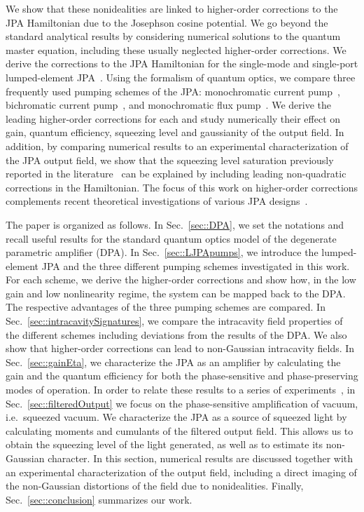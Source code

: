 \documentclass[pra,twocolumn,superscriptaddress]{revtex4-1}
\begin{document}
We show that these nonidealities are linked to higher-order corrections to the JPA Hamiltonian due to the Josephson cosine potential. We go beyond the standard analytical results by considering numerical solutions to the quantum master equation, including these usually neglected higher-order corrections. We derive the corrections to the JPA Hamiltonian for the single-mode and single-port lumped-element JPA~\cite{Roy:2016fk,Hatridge:2011qf}.
Using the formalism of quantum optics, we compare three frequently used pumping schemes of the JPA: monochromatic current pump~\cite{Hatridge:2011qf,Yurke:2006fk}, bichromatic current pump~\cite{Kamal:2009uq}, and monochromatic flux pump~\cite{Yamamoto:2008dp,Wustmann:2013uq,Zhou:2014fk}. We derive the leading higher-order corrections for each and study numerically their effect on gain, quantum efficiency, squeezing level and gaussianity of the output field. In addition, by comparing numerical results to an experimental characterization of the JPA output field, we show that the squeezing level saturation previously reported in the literature~\cite{Murch:2013kx,Zhong:2013vn} can be explained by including leading non-quadratic corrections in the Hamiltonian. The focus of this work on higher-order corrections complements recent theoretical investigations of various JPA designs~\cite{Yurke:2006fk,Kamal:2009uq,Wustmann:2013uq,Eichler:2013kx,Kochetov:2015ab,Roy:2016fk}.

The paper is organized as follows.
In Sec.~\ref{sec::DPA}, we set the notations and recall useful results for the standard quantum optics model of the degenerate parametric amplifier (DPA).
In Sec.~\ref{sec::LJPApumps}, we introduce the lumped-element JPA and the three different pumping schemes investigated in this work. For each scheme, we derive the higher-order corrections and show how, in the low gain and low nonlinearity regime, the system can be mapped back to the DPA. 
The respective advantages of the three pumping schemes are compared. In Sec.~\ref{sec::intracavitySignatures}, we compare the intracavity field properties of the different schemes including deviations from the results of the DPA. We also show that higher-order corrections can lead to non-Gaussian intracavity fields. In Sec.~\ref{sec::gainEta}, we characterize the JPA as an amplifier by calculating the gain and the quantum efficiency for both the phase-sensitive and phase-preserving modes of operation.
% 
In order to relate these results to a series of experiments~\cite{Zhong:2013vn,Murch:2013kx,Bienfait:2016yq}, in Sec.~\ref{sec::filteredOutput}
we focus on the phase-sensitive amplification of vacuum, i.e.~squeezed vacuum. We characterize the JPA as a source of squeezed light by calculating moments and cumulants of the filtered output field. This allows us to obtain the squeezing level of the light generated, as well as to estimate its non-Gaussian character. In this section, numerical results are discussed together with an experimental characterization of the output field, including a direct imaging of the non-Gaussian distortions of the field due to nonidealities.
% 
Finally, Sec.~\ref{sec::conclusion} summarizes our work.
\end{document}
